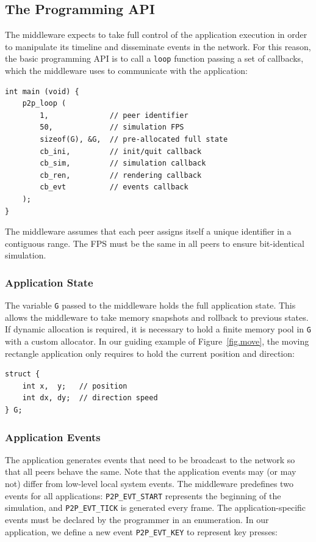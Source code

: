 \documentclass[10pt,journal,compsoc]{IEEEtran}
\newcommand{\code}[1]  {\texttt{\footnotesize{#1}}}
\begin{document}
\subsection{The Programming API}
\label{sec.tml.api}

The middleware expects to take full control of the application execution in
order to manipulate its timeline and disseminate events in the network.
For this reason, the basic programming API is to call a \code{loop} function
passing a set of callbacks, which the middleware uses to communicate with the
application:

{\footnotesize
\begin{verbatim}
int main (void) {
    p2p_loop (
        1,              // peer identifier
        50,             // simulation FPS
        sizeof(G), &G,  // pre-allocated full state
        cb_ini,         // init/quit callback
        cb_sim,         // simulation callback
        cb_ren,         // rendering callback
        cb_evt          // events callback
    );
}
\end{verbatim}
}

The middleware assumes that each peer assigns itself a unique identifier in a
contiguous range.
The FPS must be the same in all peers to ensure bit-identical simulation.

\subsubsection{Application State}
\label{sec.tml.api.state}

The variable \code{G} passed to the middleware holds the full application
state.
This allows the middleware to take memory snapshots and rollback to previous
states.
If dynamic allocation is required, it is necessary to hold a finite memory
pool in \code{G} with a custom allocator.
In our guiding example of Figure~\ref{fig.move}, the moving rectangle
application only requires to hold the current position and direction:

{\footnotesize
\begin{verbatim}
struct {
    int x,  y;   // position
    int dx, dy;  // direction speed
} G;
\end{verbatim}
}

\subsubsection{Application Events}
\label{sec.tml.api.events}

The application generates events that need to be broadcast to the network so
that all peers behave the same.
Note that the application events may (or may not) differ from low-level local
system events.
%
The middleware predefines two events for all applications:
    \code{P2P\_EVT\_START} represents the beginning of the simulation, and
    \code{P2P\_EVT\_TICK} is generated every frame.
The application-specific events must be declared by the programmer in an
enumeration.
In our application, we define a new event \code{P2P\_EVT\_KEY} to represent key
presses:
\end{document}
